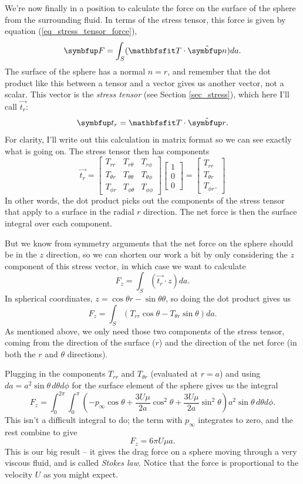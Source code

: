 We're now finally in a position to calculate the force on the surface of the sphere from the surrounding fluid.  In terms of the stress tensor, this force is given by equation (\ref{eq_stress_tensor_force}),
\[
\vec{F} = \int_S (\tens{T} \cdot \unit{n} ) da.
\]
The surface of the sphere has a normal $\unit{n} = \unit{r}$, and remember that the dot product like this between a tensor and a vector gives us another vector, not a scalar.  This vector is the \emph{stress tensor} (see Section \ref{sec_stress}), which here I'll call $\vec{t_r}$:
\[
\vec{t_r} = \tens{T} \cdot \unit{r}.
\]
For clarity, I'll write out this calculation in matrix format so we can see exactly what is going on.  The stress tensor then has components
\[
\vec{t_r} = \begin{bmatrix}
T_{rr} & T_{r\theta} & T_{r\phi} \\
T_{\theta r} & T_{\theta \theta} & T_{\theta \phi} \\
T_{\phi r} & T_{\phi \theta} & T_{\phi \phi} 
\end{bmatrix}
\begin{bmatrix}
1 \\
0 \\
0
\end{bmatrix} = \begin{bmatrix}
T_{rr} \\
T_{\theta r} \\
T_{\phi r}.
\end{bmatrix}
\]
In other words, the dot product picks out the components of the stress tensor that apply to a surface in the radial $\unit{r}$ direction.  The net force is then the surface integral over each component.

But we know from symmetry arguments that the net force on the sphere should be in the $z$ direction, so we can shorten our work a bit by only considering the $z$ component of this stress vector, in which case we want to calculate
\[
F_z = \int_S (\vec{t_r} \cdot \unit{z} ) da.
\]
In spherical coordinates, $\unit{z} = \cos\theta \unit{r} - \sin\theta \unit{\theta}$, so doing the dot product gives us
\[
F_z = \int_S ( T_{rr} \cos \theta - T_{\theta r} \sin \theta ) da.
\]
As mentioned above, we only need those two components of the stress tensor, coming from the direction of the surface ($\unit{r}$) and the direction of the net force (in both the $\unit{r}$ and $\unit{\theta}$ directions).

Plugging in the components $T_{rr}$ and $T_{\theta r}$ (evaluated at $r=a$) and using $da = a^2 \sin\theta \, d\theta d\phi$ for the surface element of the sphere gives us the integral
\[
F_z = \int_0^{2\pi} \int_0^\pi \left( -p_\infty \cos\theta + \frac{3U \mu }{2a} \cos^2\theta + \frac{3U\mu }{2a} \sin^2\theta \right) a^2 \sin\theta \, d\theta d\phi.
\]
This isn't a difficult integral to do; the term with $p_\infty$ integrates to zero, and the rest combine to give
\begin{equation}
\boxed{
F_z = 6 \pi U \mu a.
}
\end{equation}
This is our big result -- it gives the drag force on a sphere moving through a very viscous fluid, and is called \emph{Stokes law}.  Notice that the force is proportional to the velocity $U$ as you might expect.



